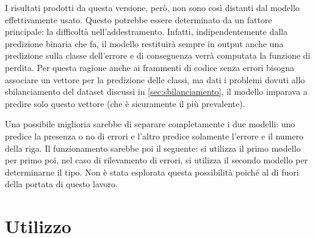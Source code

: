 I risultati prodotti da questa versione, però, non sono così distanti dal modello effettivamente usato.
Questo potrebbe essere determinato da un fattore principale: la difficoltà nell'addestramento. 
Infatti, indipendentemente dalla predizione binaria che fa, il modello restituirà sempre in output anche una predizione sulla classe dell'errore e di conseguenza verrà computata la funzione di perdita.
Per questa ragione anche ai frammenti di codice senza errori bisogna associare un vettore per la predizione delle classi, ma dati i problemi dovuti allo sbilanciamento del dataset discussi in \autoref{sec:sbilanciamento},
il modello imparava a predire solo questo vettore (che è sicuramente il più prevalente).

Una possibile miglioria sarebbe di separare completamente i due modelli: uno predice la presenza o no di errori e l'altro predice solamente l'errore e il numero della riga.
Il funzionamento sarebbe poi il seguente: si utilizza il primo modello per primo poi, nel caso di rilevamento di errori, si utilizza il secondo modello per determinarne il tipo.
Non è stata esplorata questa possibilità poiché al di fuori della portata di questo lavoro. 

\section{Utilizzo}